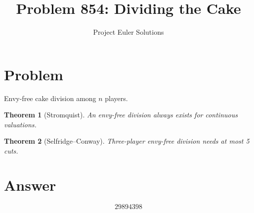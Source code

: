 \documentclass[11pt]{article}
\title{Problem 854: Dividing the Cake}
\author{Project Euler Solutions}
\date{}
\newtheorem{theorem}{Theorem}
\begin{document}
\maketitle
\section{Problem}
Envy-free cake division among $n$ players.
\begin{theorem}[Stromquist]
An envy-free division always exists for continuous valuations.
\end{theorem}
\begin{theorem}[Selfridge--Conway]
Three-player envy-free division needs at most 5 cuts.
\end{theorem}
\section{Answer}

\[
\boxed{29894398}
\]
\end{document}
